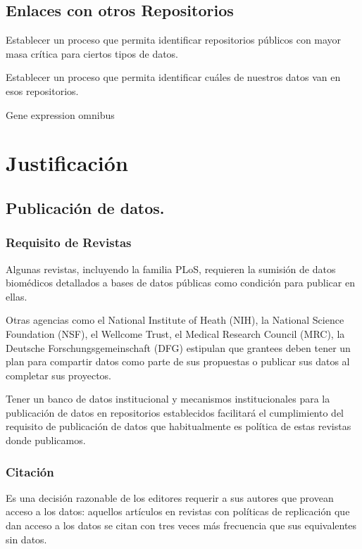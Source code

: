 \documentclass[
10pt, %
letterpaper, %
oneside, %
headinclude,footinclude, %
BCOR5mm, %
]{scrartcl}
\begin{document}
\subsection{Enlaces con otros Repositorios}
Establecer un proceso que permita identificar repositorios públicos
con mayor masa crítica para ciertos tipos de datos.

Establecer un proceso que permita identificar cuáles de nuestros datos
van en esos repositorios.
\cite{_genebank_????}
\cite{king_introduction_2007}

Gene expression omnibus

\section{Justificación}

\subsection{Publicación de datos.}


\subsubsection{Requisito de Revistas}

Algunas revistas, incluyendo la familia PLoS, requieren la sumisión de
datos biomédicos detallados a bases de datos públicas como condición
para publicar en ellas.\cite{piwowar_sharing_2007, hrynaszkiewicz}

Otras agencias como el National Institute of Heath (NIH), la National
Science Foundation (NSF), el Wellcome Trust, el Medical Research
Council (MRC), la Deutsche Forschungsgemeinschaft (DFG) estipulan que
grantees deben tener un plan para compartir datos como parte de sus
propuestas o publicar sus datos al completar sus
proyectos.\cite{wicherts_publish_2012}

Tener un banco de datos institucional y mecanismos institucionales
para la publicación de datos en repositorios establecidos facilitará
el cumplimiento del requisito de publicación de datos que
habitualmente es política de estas revistas donde publicamos.


\subsubsection{Citación}
Es una decisión razonable de los editores requerir a sus autores
que provean acceso a los datos: aquellos artículos en revistas con
políticas de replicación que dan acceso a los datos se citan con tres
veces más frecuencia que sus equivalentes sin datos.\cite{walport_sharing_2011}
\end{document}
